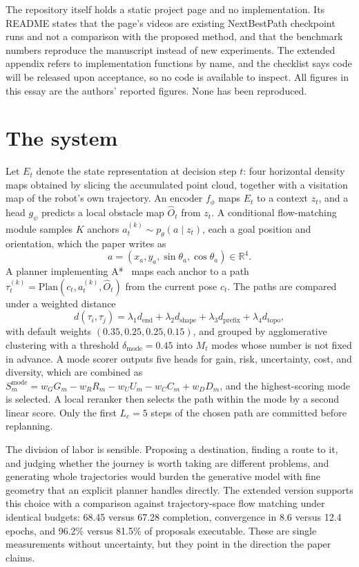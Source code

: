 \documentclass[11pt]{article}
\theoremstyle{plain}
\theoremstyle{remark}
\newcommand{\R}{\mathbb R}
\begin{document}
The repository itself holds a static project page and no implementation. Its README states that the page's videos are existing NextBestPath checkpoint runs and not a comparison with the proposed method, and that the benchmark numbers reproduce the manuscript instead of new experiments. The extended appendix refers to implementation functions by name, and the checklist says code will be released upon acceptance, so no code is available to inspect. All figures in this essay are the authors' reported figures. None has been reproduced.

\section{The system}\label{sec:system}

Let $E_t$ denote the state representation at decision step $t$: four horizontal density maps obtained by slicing the accumulated point cloud, together with a visitation map of the robot's own trajectory. An encoder $f_\phi$ maps $E_t$ to a context $z_t$, and a head $g_\psi$ predicts a local obstacle map $\hat O_t$ from $z_t$. A conditional flow-matching module samples $K$ anchors $a^{(k)}_t\sim p_\theta(a\mid z_t)$, each a goal position and orientation, which the paper writes as
\[
a=(x_a,y_a,\sin\theta_a,\cos\theta_a)\in\R^4 .
\]
A planner implementing A*~\cite{hart1968} maps each anchor to a path $\tau^{(k)}_t=\mathrm{Plan}(c_t,a^{(k)}_t,\hat O_t)$ from the current pose $c_t$. The paths are compared under a weighted distance
\[
d(\tau_i,\tau_j)=\lambda_1 d_{\mathrm{end}}+\lambda_2 d_{\mathrm{shape}}+\lambda_3 d_{\mathrm{prefix}}+\lambda_4 d_{\mathrm{topo}},
\]
with default weights $(0.35,0.25,0.25,0.15)$, and grouped by agglomerative clustering with a threshold $\delta_{\mathrm{mode}}=0.45$ into $M_t$ modes whose number is not fixed in advance. A mode scorer outputs five heads for gain, risk, uncertainty, cost, and diversity, which are combined as $S^{\mathrm{mode}}_m=w_GG_m-w_RR_m-w_UU_m-w_CC_m+w_DD_m$, and the highest-scoring mode is selected. A local reranker then selects the path within the mode by a second linear score. Only the first $L_c=5$ steps of the chosen path are committed before replanning.

The division of labor is sensible. Proposing a destination, finding a route to it, and judging whether the journey is worth taking are different problems, and generating whole trajectories would burden the generative model with fine geometry that an explicit planner handles directly. The extended version supports this choice with a comparison against trajectory-space flow matching under identical budgets: 68.45 versus 67.28 completion, convergence in 8.6 versus 12.4 epochs, and 96.2\% versus 81.5\% of proposals executable. These are single measurements without uncertainty, but they point in the direction the paper claims.
\end{document}
